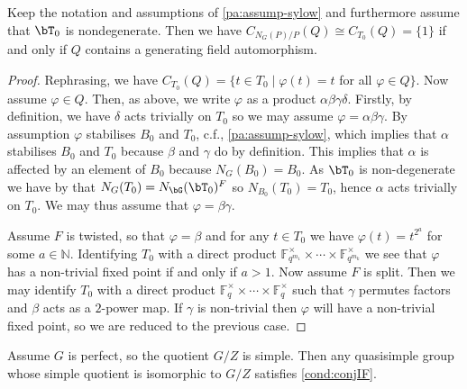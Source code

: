 \documentclass[eqthmnum, nocolour]{jt-calcs}
\begin{document}
\begin{lem}\label{lem:Q-centraliser}
Keep the notation and assumptions of \cref{pa:assump-sylow} and furthermore assume that $\bT_0$ is nondegenerate. Then we have $C_{N_G(P)/P}(Q) \cong C_{T_0}(Q) = \{1\}$ if and only if $Q$ contains a generating field automorphism.
\end{lem}

\begin{proof}
Rephrasing, we have $C_{T_0}(Q) = \{t \in T_0 \mid \varphi(t) = t$ for all $\varphi \in Q\}$. Now assume $\varphi \in Q$.  Then, as above, we write $\varphi$ as a product $\alpha\beta\gamma\delta$. Firstly, by definition, we have $\delta$ acts trivially on $T_0$ so we may assume $\varphi = \alpha\beta\gamma$. By assumption $\varphi$ stabilises $B_0$ and $T_0$, c.f., \cref{pa:assump-sylow}, which implies that $\alpha$ stabilises $B_0$ and $T_0$ because $\beta$ and $\gamma$ do by definition. This implies that $\alpha$ is affected by an element of $B_0$ because $N_G(B_0) = B_0$. As $\bT_0$ is non-degenerate we have by \cite[3.6.7]{carter:1993:finite-groups-of-lie-type} that $N_G(T_0) = N_{\bG}(\bT_0)^F$ so $N_{B_0}(T_0) = T_0$, hence $\alpha$ acts trivially on $T_0$. We may thus assume that $\varphi = \beta\gamma$.

Assume $F$ is twisted, so that $\varphi = \beta$ and for any $t \in T_0$ we have $\varphi(t) = t^{2^a}$ for some $a \in \mathbb{N}$. Identifying $T_0$ with a direct product $\mathbb{F}_{q^{m_1}}^{\times}\times\cdots\times \mathbb{F}_{q^{m_k}}^{\times}$ we see that $\varphi$ has a non-trivial fixed point if and only if $a > 1$. Now assume $F$ is split.  Then we may identify $T_0$ with a direct product $\mathbb{F}_q^{\times} \times \cdots \times \mathbb{F}_q^{\times}$ such that $\gamma$ permutes factors and $\beta$ acts as a $2$-power map. If $\gamma$ is non-trivial then $\varphi$ will have a non-trivial fixed point, so we are reduced to the previous case.
\end{proof}

\begin{prop}\label{prop:conjIF-p=2}
Assume $G$ is perfect, so the quotient $G/Z$ is simple.  Then any quasisimple group whose simple quotient is isomorphic to $G/Z$ satisfies \cref{cond:conjIF}.
\end{prop}
\end{document}
